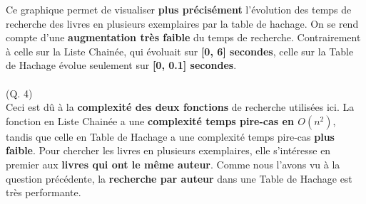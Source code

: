 \documentclass[12pt]{extarticle}
\begin{document}
Ce graphique permet de visualiser \textbf{plus précisément} l'évolution des temps de recherche des livres en plusieurs exemplaires par la table de hachage. On se rend compte d'une \textbf{augmentation très faible} du temps de recherche. Contrairement à celle sur la Liste Chainée, qui évoluait sur \textbf{[0, 6] secondes}, celle sur la Table de Hachage évolue seulement sur \textbf{[0, 0.1] secondes}.\\ \\
{\small (Q. 4)}\\
Ceci est dû à la \textbf{complexité des deux fonctions} de recherche utilisées ici. La fonction en Liste Chainée a une \textbf{complexité temps pire-cas en $O(n^2)$}, tandis que celle en Table de Hachage a une complexité temps pire-cas \textbf{plus faible}. Pour chercher les livres en plusieurs exemplaires, elle s'intéresse en premier aux \textbf{livres qui ont le même auteur}. Comme nous l'avons vu à la question précédente, la \textbf{recherche par auteur} dans une Table de Hachage est très performante.
\end{document}
